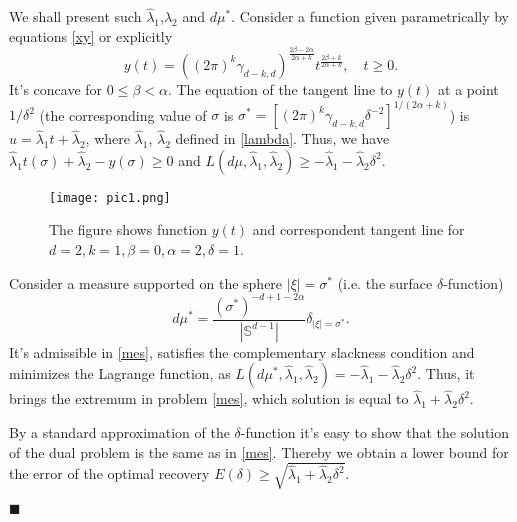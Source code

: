 \documentclass[12pt]{iopart}
\newenvironment{proof}
{\par\noindent{\bf Proof}}
{\hfill$\scriptstyle\blacksquare$}
\begin{document}
\begin{proof}
We shall present such $\widehat\lambda_1$,$\widehat\lambda_2$ and $d\mu^*$.
Consider a function given parametrically by equations \eqref{xy} or explicitly
 \[
y(t)=((2\pi)^k\gamma_{d-k,d})^{\frac{2\beta-2\alpha}{2\alpha+k}}t^{\frac{2\beta+k}{2\alpha+k}},\quad t\ge 0.
\]
It's concave for $0\le\beta<\alpha$. The equation of the tangent line to $y(t)$ at a point $1/\delta^2$ (the corresponding value of $\sigma$ is $\sigma^*=[(2\pi)^k\gamma_{d-k,d}\delta^{-2}]^{1/(2\alpha+k)}$)
is $u=\widehat\lambda_1t+\widehat\lambda_2$, where
$\widehat\lambda_1$, $\widehat\lambda_2$ defined in
\eqref{lambda}. Thus, we have
$\widehat\lambda_1t(\sigma)+\widehat\lambda_2-y(\sigma)\geqslant 0$ and
$L(d\mu,\widehat\lambda_1,\widehat\lambda_2)\geqslant
-\widehat\lambda_1-\widehat\lambda_2\delta^2.$

\begin{figure}[h]
\centering
\texttt{[image: pic1.png]}
\caption{The figure shows function $y(t)$ and correspondent tangent line for $d=2, k=1, \beta=0, \alpha=2, \delta=1$.}
\label{pic1}
\end{figure}


Consider a measure supported on the sphere $|\xi|=\sigma^* $ (i.e. the surface $\delta$-function) 
  $$
  d\mu^*=\frac{(\sigma^*)^{-d+1-2\alpha}}{|\mathbb S^{d-1}|}\delta_{|\xi|=\sigma^*}.
$$ 
It's admissible in \eqref{mes}, satisfies the complementary slackness condition and minimizes the Lagrange function, as $L(d\mu^*,\widehat\lambda_1,\widehat\lambda_2)=-\widehat\lambda_1-\widehat\lambda_2\delta^2$. Thus, it brings the extremum in problem \eqref{mes}, which solution is equal to $\widehat\lambda_1+\widehat\lambda_2\delta^2$.

By a standard approximation of the $\delta$-function it's easy to show that the solution of the dual problem is the same as in \eqref{mes}. Thereby we obtain a lower bound for the error of the optimal recovery $E(\delta)\ge\sqrt{\widehat\lambda_1+\widehat\lambda_2\delta^2}$.


\end{proof}
\end{document}
